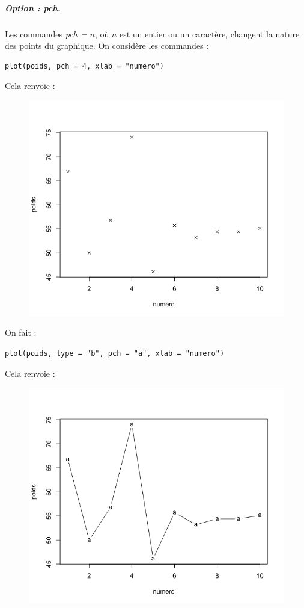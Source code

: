\subparagraph{Option : pch.} 
Les commandes \textit{pch = $n$}, où $n$ est un entier ou un caractère, changent la nature des points du graphique.\newline
On considère les commandes :
\begin{lstlisting}[language=html]
plot(poids, pch = 4, xlab = "numero")
\end{lstlisting}
Cela renvoie :
\begin{figure}[H]\begin{center}\includegraphics[scale=0.4]{ilu/gra13.png}\end{center}\end{figure}

On fait :
\begin{lstlisting}[language=html]
plot(poids, type = "b", pch = "a", xlab = "numero")
\end{lstlisting}
Cela renvoie :
\begin{figure}[H]\begin{center}\includegraphics[scale=0.4]{ilu/gra14.png}\end{center}\end{figure}

